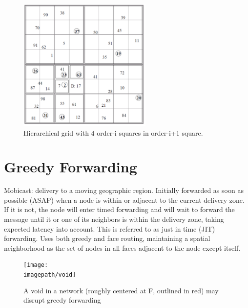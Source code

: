\documentclass[conference]{IEEEtran}
\newcommand{\imagepath}{../../images/external/location_routing}
\newcommand{\colwidth}{2.6in}
\begin{document}
\begin{figure}
\label{fig:location-service}
\centering
\includegraphics[width=\colwidth]{../../images/external/location_routing/location_service.pdf}
\caption{Hierarchical grid with 4 order-i squares in order-i+1 square.}
\end{figure}


\section{Greedy Forwarding}

\cite{Huang2005} Mobicast: delivery to a moving geographic region.
Initially forwarded as soon as possible (ASAP) when a node is within or adjacent to the current delivery zone.
If it is not, the node will enter timed forwarding and will wait to forward the message until it or one of its neighbors is within the delivery zone, taking expected latency into account.
This is referred to as just in time (JIT) forwarding.
Uses both greedy and face routing, maintaining a spatial neighborhood as the set of nodes in all faces adjacent to the node except itself.

\begin{figure}
\label{fig:network-void}
\centering
\texttt{[image: \\imagepath/void]}
\caption{A void in a network (roughly centered at F, outlined in red) may disrupt greedy forwarding}
\end{figure}
\end{document}
